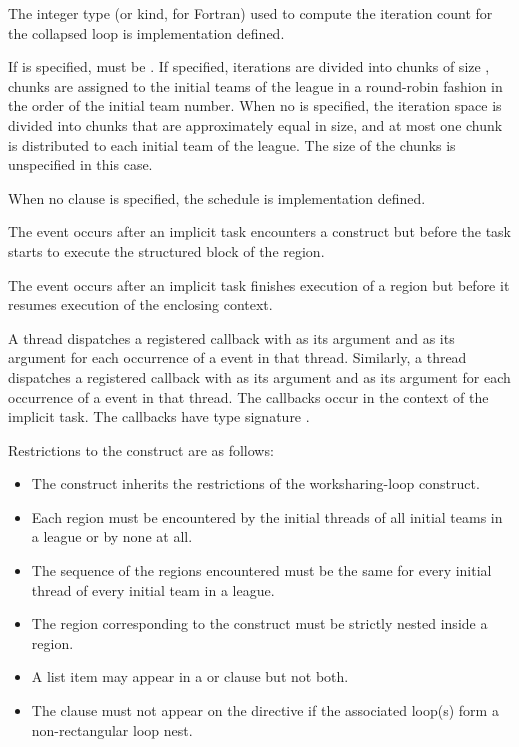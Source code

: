 The integer type (or kind, for Fortran) used to compute the iteration 
count for the collapsed loop is implementation defined.

If  is specified,  must be . 
If specified, iterations are divided into chunks of size , 
chunks are assigned to the initial teams of the league in a round-robin 
fashion in the order of the initial team number. When no  
is specified, the iteration space is divided into chunks that are 
approximately equal in size, and at most one chunk is distributed to each 
initial team of the league. The size of the chunks is unspecified in this case.

When no  clause is specified, the schedule is 
implementation defined.

\events
The  event occurs after an implicit task encounters a
 construct but before the task starts to execute the structured
block of the  region.

The  event occurs after an implicit task finishes execution of
a  region but before it resumes execution of the enclosing context.

\tools
A thread dispatches a registered  callback with
 as its  argument and
 as its  argument for each occurrence
of a  event in that thread. Similarly, a thread dispatches
a registered  callback with  as
its  argument and  as its 
argument for each occurrence of a  event in that thread.
The callbacks occur in the context of the implicit task. The callbacks have
type signature .

\restrictions
Restrictions to the  construct are as follows:

\begin{itemize}
\item The  construct inherits the restrictions of the 
      worksharing-loop construct.
\item Each  region must be encountered by the initial
      threads of all initial teams in a league or by none at all.
\item The sequence of the  regions encountered must
      be the same for every initial thread of every initial team in a league.
\item The region corresponding to the  construct must be
      strictly nested inside a  region.
\item A list item may appear in a  or  
      clause but not both.
\item The  clause must not appear on the 
      directive if the associated loop(s) form a non-rectangular loop nest.
\end{itemize}


